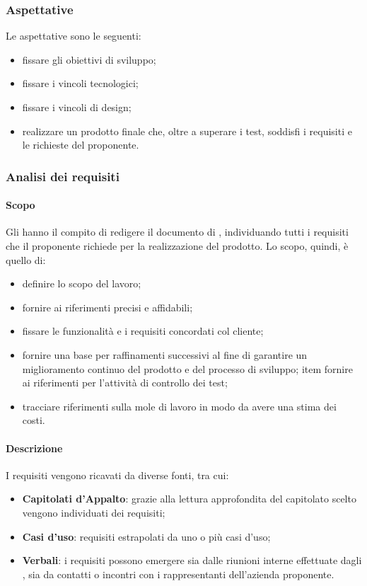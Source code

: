 \subsubsection{Aspettative}
Le aspettative sono le seguenti:
\begin{itemize}
	\item fissare gli obiettivi di sviluppo;
	\item fissare i vincoli tecnologici;
	\item fissare i vincoli di design;
	\item realizzare un prodotto finale che,  oltre a superare i test,  soddisfi i requisiti e le richieste del proponente.
\end{itemize}
\subsubsection{Analisi dei requisiti}
\paragraph{Scopo}
Gli \anas{} hanno il compito di redigere il documento di \AdR{}, individuando tutti i requisiti che il proponente richiede per la realizzazione del prodotto.  Lo scopo,  quindi,  è quello di:
\begin{itemize}
	\item definire lo scopo del lavoro;
	\item fornire ai \progs{} riferimenti precisi e affidabili;
	\item fissare le funzionalità e i requisiti concordati col cliente;
	\item fornire una base per raffinamenti successivi al fine di garantire un miglioramento continuo del prodotto e del processo di sviluppo;
	item fornire ai \vers{} riferimenti per l'attività di controllo dei test;
	\item tracciare riferimenti sulla mole di lavoro in modo da avere una stima dei costi.
\end{itemize}
\paragraph{Descrizione}
I requisiti vengono ricavati da diverse fonti,  tra cui:
\begin{itemize}
	\item \textbf{Capitolati d'Appalto}: grazie alla lettura approfondita del capitolato scelto vengono individuati dei requisiti;
	\item \textbf{Casi d'uso}: requisiti estrapolati da uno o più casi d'uso; 
	\item \textbf{Verbali}: i requisiti possono emergere sia dalle riunioni interne effettuate dagli \anas{}, sia da contatti o incontri con i rappresentanti dell'azienda proponente.
\end{itemize}
